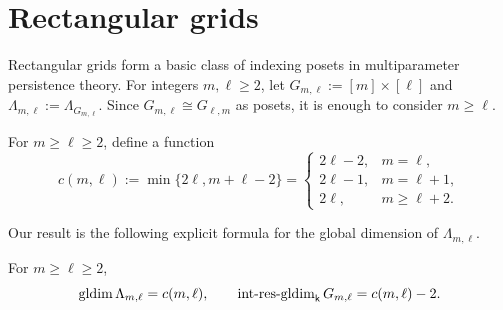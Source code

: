 \section{Rectangular grids}
\label{sec:grids}

Rectangular grids form a basic class of indexing posets in
multiparameter persistence theory.  For integers $m,\ell\geq 2$,
let $G_{m,\ell}:=[m]\times[\ell]$ and
$\Lambda_{m,\ell}:=\Lambda_{G_{m,\ell}}$.
Since $G_{m,\ell}\cong G_{\ell,m}$ as posets, it is enough to consider
$m\geq\ell$.  

For $m\geq\ell\geq2$, define a function
\begin{equation}
\label{eq:grid-combinatorial-function}
c(m,\ell)
:=
\min\{2\ell,m+\ell-2\}
=
\begin{cases}
2\ell-2,&m=\ell,\\
2\ell-1,&m=\ell+1,\\
2\ell,&m\geq\ell+2.
\end{cases}
\end{equation}

Our result is the following explicit formula for the global dimension of $\Lambda_{m,\ell}$.

\begin{theorem}
\label{thm:grid-exact-formula}
For $m\geq\ell\geq2$,
\begin{equation}
\label{eq:grid-exact-formula}
\operatorname{gldim}\Lambda_{m,\ell}=c(m,\ell),
\qquad
\operatorname{int\text{-}res\text{-}gldim}_{\mathsf{k}} G_{m,\ell}=c(m,\ell)-2.
\end{equation}
\end{theorem}


